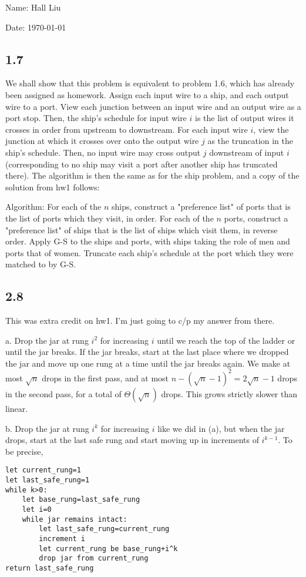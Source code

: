 \documentclass{article}
\begin{document}
Name: Hall Liu

Date: \today 
\vspace{1.5cm}

\subsection*{1.7}
We shall show that this problem is equivalent to problem 1.6, which has already been assigned as homework. Assign each input wire to a ship, and each output wire to a port. View each junction between an input wire and an output wire as a port stop. Then, the ship's schedule for input wire $i$ is the list of output wires it crosses in order from upstream to downstream. For each input wire $i$, view the junction at which it crosses over onto the output wire $j$ as the truncation in the ship's schedule. Then, no input wire may cross output $j$ downstream of input $i$ (corresponding to no ship may visit a port after another ship has truncated there). The algorithm is then the same as for the ship problem, and a copy of the solution from hw1 follows:

Algorithm: For each of the $n$ ships, construct a "preference list" of ports that is the list of ports which they visit, in order. For each of the $n$ ports, construct a "preference list" of ships that is the list of ships which visit them, in reverse order. Apply G-S to the ships and ports, with ships taking the role of men and ports that of women. Truncate each ship's schedule at the port which they were matched to by G-S.
\subsection*{2.8}
This was extra credit on hw1. I'm just going to c/p my answer from there. 

a. Drop the jar at rung $i^2$ for increasing $i$ until we reach the top of the ladder or until the jar breaks. If the jar breaks, start at the last place where we dropped the jar and move up one rung at a time until the jar breaks again. We make at most $\sqrt{n}$ drops in the first pass, and at most $n-(\sqrt{n}-1)^2=2\sqrt{n}-1$ drops in the second pass, for a total of $\Theta(\sqrt{n})$ drops. This grows strictly slower than linear.

b. Drop the jar at rung $i^k$ for increasing $i$ like we did in (a), but when the jar drops, start at the last safe rung and start moving up in increments of $i^{k-1}$. To be precise,
\begin{verbatim}
let current_rung=1
let last_safe_rung=1
while k>0:
    let base_rung=last_safe_rung
    let i=0
    while jar remains intact:
        let last_safe_rung=current_rung
        increment i
        let current_rung be base_rung+i^k
        drop jar from current_rung
return last_safe_rung
\end{verbatim}
\end{document}
